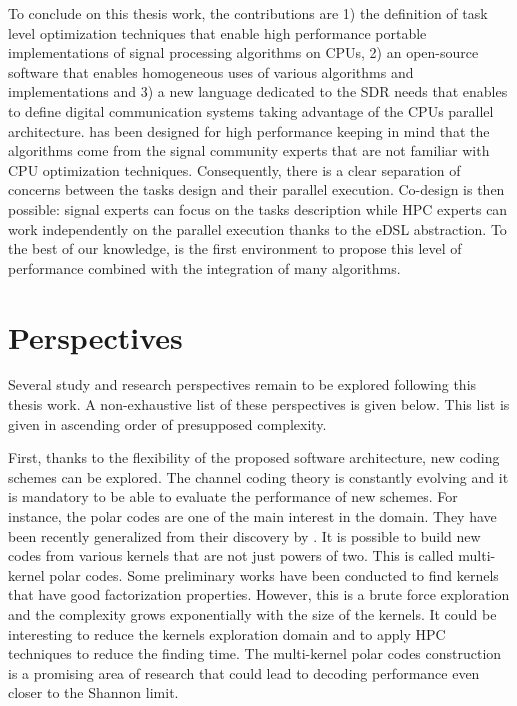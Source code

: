 To conclude on this thesis work, the contributions are 1) the definition of task
level optimization techniques that enable high performance portable
implementations of signal processing algorithms on CPUs, 2) an open-source
software that enables homogeneous uses of various algorithms and implementations
and 3) a new language dedicated to the SDR needs that enables to define digital
communication systems taking advantage of the CPUs parallel architecture.
\AFFECT has been designed for high performance keeping in mind that the
algorithms come from the signal community experts that are not familiar with CPU
optimization techniques. Consequently, there is a clear separation of concerns
between the tasks design and their parallel execution. Co-design is then
possible: signal experts can focus on the tasks description while HPC experts
can work independently on the parallel execution thanks to the eDSL abstraction.
To the best of our knowledge, \AFFECT is the first environment to propose this
level of performance combined with the integration of many algorithms.

\section*{Perspectives}

Several study and research perspectives remain to be explored following this
thesis work. A non-exhaustive list of these perspectives is given below. This
list is given in ascending order of presupposed complexity.

First, thanks to the flexibility of the proposed software architecture, new
coding schemes can be explored. The channel coding theory is constantly evolving
and it is mandatory to be able to evaluate the performance of new schemes. For
instance, the polar codes are one of the main interest in the domain. They have
been recently generalized from their discovery by \Arikan. It is possible to
build new codes from various kernels that are not just powers of two. This is
called multi-kernel polar codes. Some preliminary works have been conducted to
find kernels that have good factorization properties. However, this is a brute
force exploration and the complexity grows exponentially with the size of the
kernels. It could be interesting to reduce the kernels exploration domain and to
apply HPC techniques to reduce the finding time. The multi-kernel polar codes
construction is a promising area of research that could lead to decoding
performance even closer to the Shannon limit.

